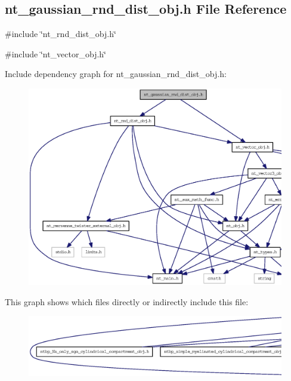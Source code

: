 \subsection{nt\_\-gaussian\_\-rnd\_\-dist\_\-obj.h File Reference}
\label{nt__gaussian__rnd__dist__obj_8h}
{\ttfamily \#include \char`\"{}nt\_\-rnd\_\-dist\_\-obj.h\char`\"{}}\par
{\ttfamily \#include \char`\"{}nt\_\-vector\_\-obj.h\char`\"{}}\par
Include dependency graph for nt\_\-gaussian\_\-rnd\_\-dist\_\-obj.h:
\nopagebreak
\begin{figure}[H]
\begin{center}
\leavevmode
\includegraphics[width=400pt]{nt__gaussian__rnd__dist__obj_8h__incl}
\end{center}
\end{figure}
This graph shows which files directly or indirectly include this file:
\nopagebreak
\begin{figure}[H]
\begin{center}
\leavevmode
\includegraphics[width=400pt]{nt__gaussian__rnd__dist__obj_8h__dep__incl}
\end{center}
\end{figure}
